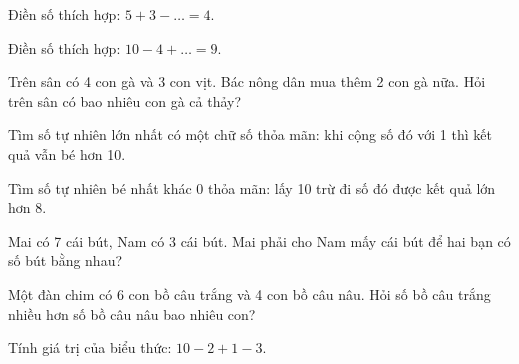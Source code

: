 \begin{ex}
Điền số thích hợp: $5 + 3 - \dots = 4$.
\end{ex}

\begin{ex}
Điền số thích hợp: $10 - 4 + \dots = 9$.
\end{ex}

\begin{ex}
Trên sân có 4 con gà và 3 con vịt. Bác nông dân mua thêm 2 con gà nữa. Hỏi trên sân có bao nhiêu con gà cả thảy?
\end{ex}

\begin{ex}
Tìm số tự nhiên lớn nhất có một chữ số thỏa mãn: khi cộng số đó với 1 thì kết quả vẫn bé hơn 10.
\end{ex}

\begin{ex}
Tìm số tự nhiên bé nhất khác 0 thỏa mãn: lấy 10 trừ đi số đó được kết quả lớn hơn 8.
\end{ex}

\begin{ex}
Mai có 7 cái bút, Nam có 3 cái bút. Mai phải cho Nam mấy cái bút để hai bạn có số bút bằng nhau?
\end{ex}

\begin{ex}
Một đàn chim có 6 con bồ câu trắng và 4 con bồ câu nâu. Hỏi số bồ câu trắng nhiều hơn số bồ câu nâu bao nhiêu con?
\end{ex}

\begin{ex}
Tính giá trị của biểu thức: $10 - 2 + 1 - 3$.
\end{ex}

